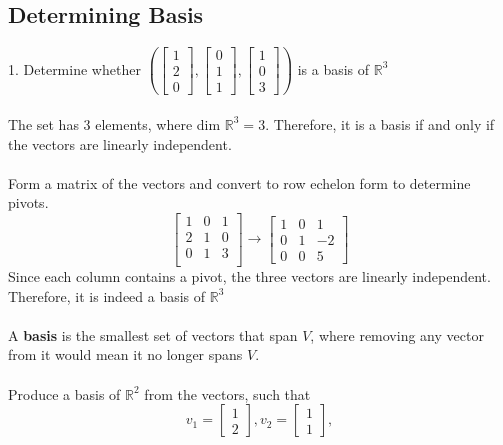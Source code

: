 \begin{enumerate}
\subsection{Determining Basis}
1. Determine whether $(\begin{bmatrix} 1 \\ 2 \\ 0 \end{bmatrix}, 
\begin{bmatrix} 0 \\ 1 \\ 1 \end{bmatrix}, \begin{bmatrix} 1 \\ 0 \\ 3 \end{bmatrix})$
is a basis of $\mathbb{R}^3$ \\\\
The set has $3$ elements, where dim $\mathbb{R}^3 = 3$. Therefore, it is a basis if and 
only if the vectors are linearly independent. \\\\ 
Form a matrix of the vectors and convert to row echelon form to determine 
pivots. 
\[
  \begin{bmatrix} 1 & 0 & 1 \\
    2 & 1 & 0 \\ 
    0 & 1 & 3 \\
  \end{bmatrix} \rightarrow 
    \begin{bmatrix} 1 & 0 & 1 \\
    0 & 1 & -2 \\ 0 & 0 & 5 \end{bmatrix}
\] Since each column contains a pivot, the three vectors are linearly independent. 
Therefore, it is indeed a basis of $\mathbb{R}^3$ \\\\
A \textbf{basis} is the smallest set of vectors that span $V$, where removing any vector from it 
would mean it no longer spans $V$. \\\\
Produce a basis of $\mathbb{R}^2$ from the vectors, such that 
\[
  v_1 = \begin{bmatrix} 1 \\ 2 \end{bmatrix}, v_2 = \begin{bmatrix} 1 \\ 1 \end{bmatrix}, 
\]
\end{enumerate}
